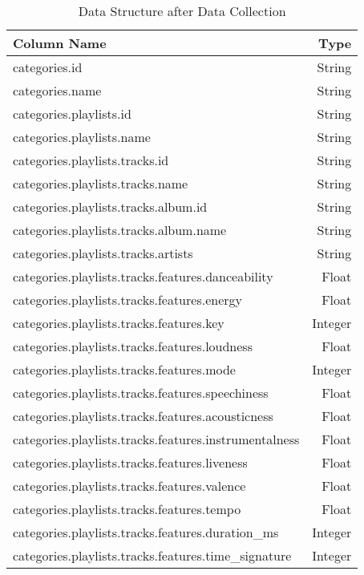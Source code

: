 \begin{table}[H]
    \centering
    \caption{Data Structure after Data Collection}
    \label{tbl:Data after Import}
    \begin{tabular}{lr} 
        \toprule
        Column Name & Type \\ [0.5ex]
        \midrule
        categories.id & String\\ [1ex]
        categories.name & String \\ [1ex]
        categories.playlists.id & String \\ [1ex]
        categories.playlists.name & String \\ [1ex]
        categories.playlists.tracks.id & String \\ [1ex]
        categories.playlists.tracks.name & String \\ [1ex]
        categories.playlists.tracks.album.id & String \\ [1ex]
        categories.playlists.tracks.album.name & String \\ [1ex]
        categories.playlists.tracks.artists & String \\ [1ex]
        categories.playlists.tracks.features.danceability & Float \\ [1ex]
        categories.playlists.tracks.features.energy & Float \\ [1ex]
        categories.playlists.tracks.features.key & Integer \\ [1ex]
        categories.playlists.tracks.features.loudness & Float \\ [1ex]
        categories.playlists.tracks.features.mode & Integer \\ [1ex]
        categories.playlists.tracks.features.speechiness & Float \\ [1ex]
        categories.playlists.tracks.features.acousticness & Float \\ [1ex]
        categories.playlists.tracks.features.instrumentalness & Float \\ [1ex]
        categories.playlists.tracks.features.liveness & Float \\ [1ex]
        categories.playlists.tracks.features.valence & Float \\ [1ex]
        categories.playlists.tracks.features.tempo & Float \\ [1ex]
        categories.playlists.tracks.features.duration\_ms & Integer \\ [1ex]
        categories.playlists.tracks.features.time\_signature & Integer \\ [1ex]
        \bottomrule
    \end{tabular}
\end{table}

